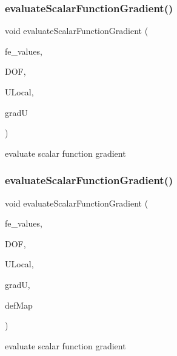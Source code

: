 \subsubsection{\texorpdfstring{evaluateScalarFunctionGradient()}{evaluateScalarFunctionGradient()}\hspace{0.1cm}{\footnotesize\ttfamily [1/4]}}
{\footnotesize\ttfamily void evaluate\+Scalar\+Function\+Gradient (\begin{DoxyParamCaption}\item[{const F\+E\+Values$<$ dim $>$ \&}]{fe\+\_\+values,  }\item[{unsigned int}]{D\+OF,  }\item[{Table$<$ 1, T $>$ \&}]{U\+Local,  }\item[{Table$<$ 2, T $>$ \&}]{gradU }\end{DoxyParamCaption})}

evaluate scalar function gradient \mbox{\label{group___evaluation_functions_gabeb71201e8213a7c7616cd8824617f73}} 
\subsubsection{\texorpdfstring{evaluateScalarFunctionGradient()}{evaluateScalarFunctionGradient()}\hspace{0.1cm}{\footnotesize\ttfamily [2/4]}}
{\footnotesize\ttfamily void evaluate\+Scalar\+Function\+Gradient (\begin{DoxyParamCaption}\item[{const F\+E\+Values$<$ dim $>$ \&}]{fe\+\_\+values,  }\item[{unsigned int}]{D\+OF,  }\item[{Table$<$ 1, T $>$ \&}]{U\+Local,  }\item[{Table$<$ 2, T $>$ \&}]{gradU,  }\item[{\mbox{\hyperlink{structdeformation_map}{deformation\+Map}}$<$ T, dim $>$ \&}]{def\+Map }\end{DoxyParamCaption})}

evaluate scalar function gradient \mbox{\label{group___evaluation_functions_ga4622566d0fe19b017cf8d2643ffeb47a}} 
